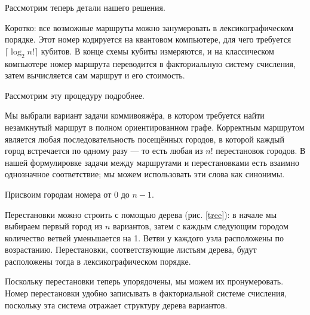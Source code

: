 

Рассмотрим теперь детали нашего решения.




Коротко: все возможные маршруты можно занумеровать в лексикографическом порядке. Этот номер кодируется на квантовом компьютере, для чего требуется $\lceil \log_2 n! \rceil$ кубитов. В конце схемы кубиты измеряются, и на классическом компьютере номер маршрута переводится в факториальную систему счисления, затем вычисляется сам маршрут и его стоимость.


Рассмотрим эту процедуру подробнее.




Мы выбрали вариант задачи коммивояжёра, в котором требуется найти незамкнутый маршрут в полном ориентированном графе. Корректным маршрутом является любая последовательность посещённых городов, в которой каждый город встречается по одному разу --- то есть любая из $n!$ перестановок городов. В нашей формулировке задачи между маршрутами и перестановками есть взаимно однозначное соответствие; мы можем использовать эти слова как синонимы.


Присвоим городам номера от 0 до $n-1$.

Перестановки можно строить с помощью дерева (рис. \ref{tree}): в начале мы выбираем первый город из $n$ вариантов, затем с каждым следующим городом количество ветвей уменьшается на 1. Ветви у каждого узла расположены по возрастанию. Перестановки, соответствующие листьям дерева, будут расположены тогда в лексикографическом порядке.


Поскольку перестановки теперь упорядочены, мы можем их пронумеровать. Номер перестановки удобно записывать в факториальной системе счисления, поскольку эта система отражает структуру дерева вариантов. 

